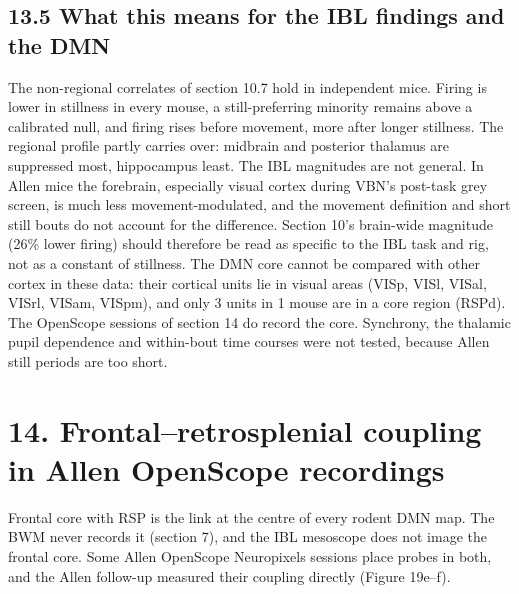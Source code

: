 \documentclass[10pt,a4paper]{article}
\begin{document}
\subsection{13.5 What this means for the IBL findings and the DMN}
The non-regional correlates of section 10.7 hold in independent mice. Firing is lower in stillness in every mouse, a still-preferring minority remains above a calibrated null, and firing rises before movement, more after longer stillness. The regional profile partly carries over: midbrain and posterior thalamus are suppressed most, hippocampus least. The IBL magnitudes are not general. In Allen mice the forebrain, especially visual cortex during VBN's post-task grey screen, is much less movement-modulated, and the movement definition and short still bouts do not account for the difference. Section 10's brain-wide magnitude (26\% lower firing) should therefore be read as specific to the IBL task and rig, not as a constant of stillness. The DMN core cannot be compared with other cortex in these data: their cortical units lie in visual areas (VISp, VISl, VISal, VISrl, VISam, VISpm), and only 3 units in 1 mouse are in a core region (RSPd). The OpenScope sessions of section 14 do record the core. Synchrony, the thalamic pupil dependence and within-bout time courses were not tested, because Allen still periods are too short.

\section{14. Frontal--retrosplenial coupling in Allen OpenScope recordings}
Frontal core with RSP is the link at the centre of every rodent DMN map. The BWM never records it (section 7), and the IBL mesoscope does not image the frontal core. Some Allen OpenScope Neuropixels sessions place probes in both, and the Allen follow-up measured their coupling directly (Figure 19e--f).
\end{document}
